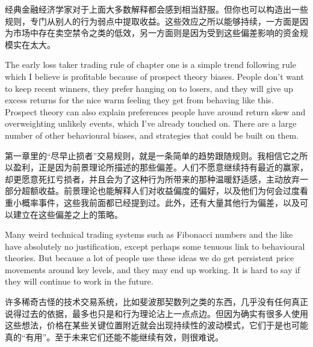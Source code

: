 \begin{chineseblock}经典金融经济学家对于上面大多数解释都会感到相当舒服。但你也可以构造出一些规则，专门从别人的行为弱点中提取收益。这些效应之所以能够持续，一方面是因为市场中存在卖空禁令之类的低效，另一方面则是因为受到这些偏差影响的资金规模实在太大。\end{chineseblock}

\bipairgap

\begin{englishblock} The early loss taker trading rule of chapter one is a simple trend following rule which I believe is profitable because of prospect theory biases. People don't want to keep recent winners, they prefer hanging on to losers, and they will give up excess returns for the nice warm feeling they get from behaving like this. Prospect theory can also explain preferences people have around return skew and overweighting unlikely events, which I've already touched on. There are a large number of other behavioural biases, and strategies that could be built on them. \end{englishblock}

\begin{chineseblock}第一章里的“尽早止损者”交易规则，就是一条简单的趋势跟随规则。我相信它之所以盈利，正是因为前景理论所描述的那些偏差。人们不愿意继续持有最近的赢家，却更愿意死扛亏损者，并且会为了这种行为所带来的那种温暖舒适感，主动放弃一部分超额收益。前景理论也能解释人们对收益偏度的偏好，以及他们为何会过度看重小概率事件，这些我前面都已经提到过。此外，还有大量其他行为偏差，以及可以建立在这些偏差之上的策略。\end{chineseblock}


\begin{englishblock} Many weird technical trading systems such as Fibonacci numbers and the like have absolutely no justification, except perhaps some tenuous link to behavioural theories. But because a lot of people use these ideas we do get persistent price movements around key levels, and they may end up working. It is hard to say if they will continue to work in the future. \end{englishblock}

\begin{chineseblock}许多稀奇古怪的技术交易系统，比如斐波那契数列之类的东西，几乎没有任何真正说得过去的依据，最多也只是和行为理论沾上一点点边。但因为确实有很多人使用这些想法，价格在某些关键位置附近就会出现持续性的波动模式，它们于是也可能真的“有用”。至于未来它们还能不能继续有效，则很难说。\end{chineseblock}

